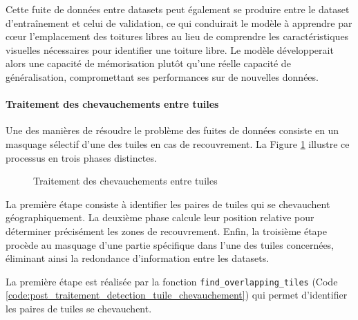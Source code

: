 Cette fuite de données entre datasets peut également se produire entre le dataset d'entraînement et celui de validation, ce qui conduirait le modèle à apprendre par cœur l'emplacement des toitures libres au lieu de comprendre les caractéristiques visuelles nécessaires pour identifier une toiture libre. Le modèle développerait alors une capacité de mémorisation plutôt qu'une réelle capacité de généralisation, compromettant ses performances sur de nouvelles données.

\paragraph{Traitement des chevauchements entre tuiles}
Une des manières de résoudre le problème des fuites de données consiste en un masquage sélectif d'une des tuiles en cas de recouvrement. La Figure \ref{fig:ch3_postprocessing_dataset_05_traitement_chevauchement} illustre ce processus en trois phases distinctes.

\begin{figure}[H]
    \centering
    \caption{Traitement des chevauchements entre tuiles}
    \label{fig:ch3_postprocessing_dataset_05_traitement_chevauchement}
\end{figure}

La première étape consiste à identifier les paires de tuiles qui se chevauchent géographiquement. La deuxième phase calcule leur position relative pour déterminer précisément les zones de recouvrement. Enfin, la troisième étape procède au masquage d'une partie spécifique dans l'une des tuiles concernées, éliminant ainsi la redondance d'information entre les datasets.

La première étape est réalisée par la fonction \texttt{find\_overlapping\_tiles} (Code \ref{code:post_traitement_detection_tuile_chevauchement}) qui permet d'identifier les paires de tuiles se chevauchent.

